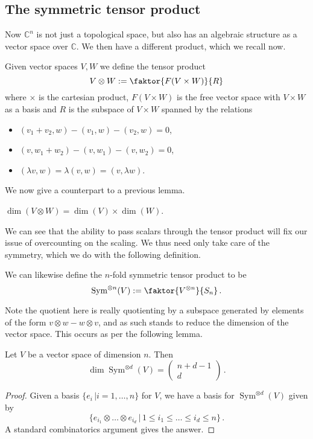 \documentclass{article}
\begin{document}
\subsection{The symmetric tensor product}
Now $\mathbb{C}^n$ is not just a topological space, but also has an algebraic structure as a vector space over $\mathbb{C}$. We then have a different product, which we recall now.
\begin{definition}
	Given vector spaces $V, W$ we define the tensor product 
	\[
	V \otimes W := \faktor{F(V \times W)}{R}
	\]
	where $\times$ is the cartesian product, $F(V \times W)$ is the free vector space with $V \times W$ as a basis and $R$ is the subspace of $V \times W$ spanned by the relations
	\begin{itemize}
		\item $(v_1+v_2, w)-(v_1, w)-(v_2, w)=0$,
		\item $(v, w_1+w_2)-(v,w_1)-(v,w_2)=0$,
		\item $(\lambda v, w) = \lambda(v,w) = (v, \lambda w)$.
	\end{itemize}
\end{definition}
We now give a counterpart to a previous lemma.
\begin{lemma}
	$\dim (V \otimes W) = \dim (V) \times \dim(W)$. 
\end{lemma}
We can see that the ability to pass scalars through the tensor product will fix our issue of overcounting on the scaling. We thus need only take care of the symmetry, which we do with the following definition.
\begin{definition}
	We can likewise define the $n$-fold symmetric tensor product to be 
	\[
	\operatorname{Sym}^{\otimes n}(V) := \faktor{V^{\otimes n}}{S_n} \, .
	\]
\end{definition}
Note the quotient here is really quotienting by a subspace generated by elements of the form $v \otimes w - w \otimes v$, and as such stands to reduce the dimension of the vector space. This occurs as per the following lemma.
\begin{lemma}
	Let $V$ be a vector space of dimension $n$. Then 
	\[
	\dim \operatorname{Sym}^{\otimes d}(V) = \begin{pmatrix}
	n + d-1 \\ d
	\end{pmatrix} \, .
	\]
\end{lemma}
\begin{proof}
	Given a basis $\{e_i \, | i=1, \dots, n\}$ for $V$, we have a basis for $\operatorname{Sym}^{\otimes d}(V)$ given by 
	\[
	\{ e_{i_1} \otimes \dots \otimes e_{i_d} \, | \, 1 \leq i_1 \leq \dots \leq i_d \leq n\} \, .
	\]
	A standard combinatorics argument gives the answer. 
\end{proof}
\end{document}

